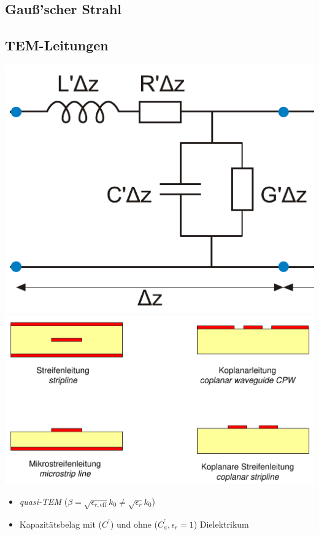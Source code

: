 {\begin{itemize}
 \end{itemize}
 \subsection{Gauß'scher Strahl}
 \subsection{TEM-Leitungen}
 \includegraphics[width=.18\paperheight]{content/fuw/pictures/fuw_tem_ersatzschaltbild.png}
 \includegraphics[width=.22\paperheight]{content/fuw/pictures/fuw_tem_leitungen.png}
  \begin{itemize}
     \itemsep0pt
     \item \textit{quasi-TEM} (\(\beta = \sqrt{\epsilon_{r,\mathrm{eff}}} k_0 \neq \sqrt{\epsilon_r} k_0\))
     \item Kapazitätsbelag mit ($C^\prime$) und ohne ($C_a^\prime, \epsilon_r = 1$) Dielektrikum

\end{itemize}}
